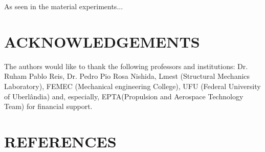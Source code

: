 \documentclass[10pt,fleqn,a4paper,twoside]{article}
\begin{document}
As seen in the material experiments...








\section{ACKNOWLEDGEMENTS}
The authors would like to thank the following professors and institutions: Dr. Ruham Pablo Reis, Dr. Pedro Pio Rosa Nishida, Lmest (Structural Mechanics Laboratory), FEMEC (Mechanical engineering College), UFU (Federal University of Uberl\^andia) and, especially, EPTA(Propulsion and Aerospace Technology Team) for financial support.




\section{REFERENCES} 


\renewcommand{\refname}{}

\end{document}

